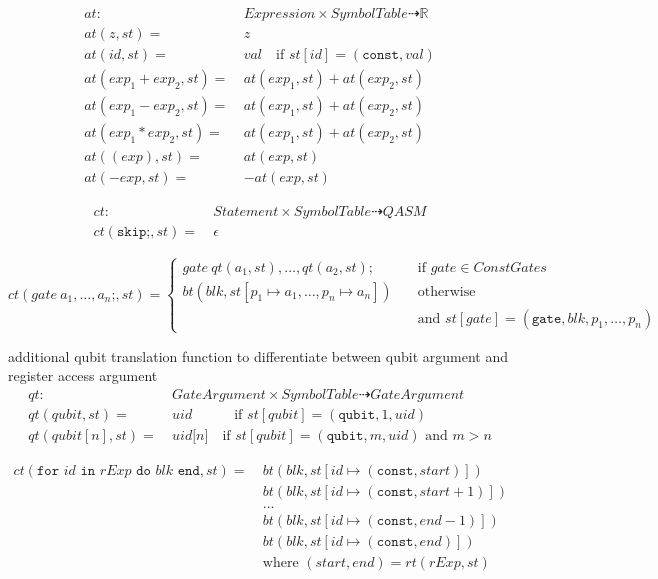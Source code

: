 \begin{align*}
    at : \ & Expression \times SymbolTable \dashrightarrow \mathbb{R}\\
    at(z, st) = \ & z\\
    at(id, st) = \ & val \quad \text{if } st[id] = (\texttt{const}, val)\\
    at(exp_1 + exp_2, st) = \ & at(exp_1, st) + at(exp_2, st)\\
    at(exp_1 - exp_2, st) = \ & at(exp_1, st) + at(exp_2, st)\\
    at(exp_1 * exp_2, st) = \ & at(exp_1, st) + at(exp_2, st)\\
    at((exp), st) = \ & at(exp, st)\\
    at(-exp, st) = \ & -at(exp, st)
\end{align*}


\begin{align*}
    ct : \ & Statement \times SymbolTable \dashrightarrow QASM\\
    ct(\texttt{skip;}, st) = \ & \epsilon
\end{align*}

\begin{equation*}
    ct(gate \ a_1, \dots, a_n\texttt{;}, st) = 
    \begin{cases}
        gate \ qt(a_1, st), \dots, qt(a_2, st); \quad &\text{if } gate \in ConstGates\\
        bt(blk, st[p_1 \mapsto a_1, \dots, p_n \mapsto a_n]) \quad &\text{otherwise }\\
        &\text{and } st[gate] = (\texttt{gate}, blk, p_1, \dots, p_n)
    \end{cases}
\end{equation*}

additional qubit translation function to differentiate between qubit argument and register access argument
\begin{align*}
    qt :\ & \displaystyle GateArgument \times SymbolTable \dashrightarrow GateArgument\\
    qt(qubit, st) = \ & uid \quad\quad\quad \text{if } st[qubit] = (\texttt{qubit}, 1, uid)\\
    qt(qubit[n], st) = \ & uid\texttt{[}n\texttt{]} \quad \text{if } st[qubit] = (\texttt{qubit}, m, uid) \text{ and } m > n
\end{align*}

\begin{align*}
    ct(\texttt{for } id \texttt{ in } rExp \texttt{ do } blk \texttt{ end}, st) = \ 
        & bt(blk, st[id \mapsto (\texttt{const}, start)])\\
        & bt(blk, st[id \mapsto (\texttt{const}, start + 1)])\\
        & \dots\\
        & bt(blk, st[id \mapsto (\texttt{const}, end - 1)])\\
        & bt(blk, st[id \mapsto (\texttt{const}, end)])\\
        & \text{where } (start, end) = rt(rExp, st)
\end{align*}

